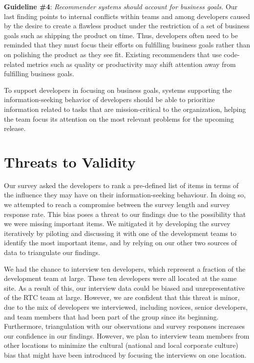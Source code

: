 \documentclass[12pt,oneside]{book}
\begin{document}
\textbf{Guideline \#4}: \emph{Recommender systems should account for business goals.}
Our last finding points to internal conflicts within teams and among developers caused by the desire to create a flawless product under the restriction of a set of business goals such as shipping the product on time.
Thus, developers often need to be reminded that they must focus their efforts on fulfilling business goals rather than on polishing the product as they see fit. Existing recommenders that use code-related metrics such as quality or productivity may shift attention away from fulfilling business goals.


To support developers in focusing on business goals, systems supporting the information-seeking behavior of developers should be able to prioritize information related to tasks that are mission-critical to the organization, helping the team focus its attention on the most relevant problems for the upcoming release.



\section{Threats to Validity}
\label{sec:threats}

Our survey asked the developers to rank a pre-defined list of items in
terms of the influence they may have on their information-seeking behaviour.
In doing so, we attempted to reach a compromise between the survey length and
survey response rate. 
This bias poses a threat to our findings due to the possibility that we were missing important items.
We mitigated it by developing the survey iteratively by piloting and discussing it with one of the development teams to identify the most important items, and by relying on our other two sources of data to triangulate our findings.

We had the chance to interview ten developers, which represent a fraction of the development team at large. These ten developers were all located at the same site. As a result of this, our interview data could be biased and unrepresentative of the RTC team at large.
However, we are confident that this threat is minor, due to the mix of developers we interviewed, including novices, senior developers, and team members that had been part of the group since its beginning.
Furthermore, triangulation with our observations and survey responses increases our confidence in our findings.
However, we plan to interview team members from other locations to minimize the cultural (national and local corporate culture) bias that might have been introduced by focusing the interviews on one location. 
\end{document}
